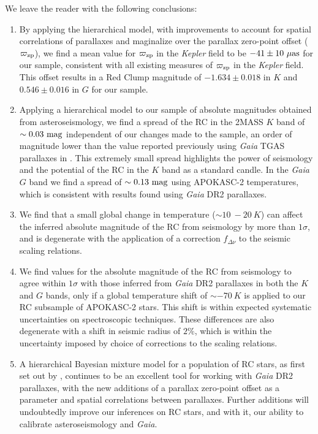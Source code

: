 \documentclass[fleqn,usenatbib]{mnras}
\newcommand{\oozp}{\mbox{$\varpi_{\rm zp}$}\xspace}
\newcommand{\fdnu}{\mbox{$f_{\Delta\nu}$}\xspace}
\newcommand{\kepler}{\emph{Kepler}\xspace}
\newcommand{\gaia}{\emph{Gaia}\xspace}
\newcommand{\nnew}[1]{#1}
\newcommand{\up}[1]{#1}
\begin{document}
We leave the reader with the following conclusions:

\begin{enumerate}
\item By applying the  hierarchical model, with improvements to account for spatial correlations of parallaxes and maginalize over the parallax zero-point offset (\oozp), \up{we find a mean value for \oozp in the \kepler field to be $-41 \pm 10\ \mu \rm as$ for our sample}, consistent with all existing measures of \oozp in the \kepler field. This offset results in a Red Clump magnitude of $-1.634 \pm 0.018$ in $K$ and $0.546 \pm 0.016$ in $G$ for our sample.

\item Applying a hierarchical model to our sample of absolute magnitudes obtained from asteroseismology, we find a spread of the RC in the 2MASS $K$ band of $\sim 0.03\ \rm mag$ independent of our changes made to the sample, an order of magnitude lower than the value reported previously using \gaia TGAS parallaxes in . This extremely small spread highlights the power of seismology and the potential of the RC in the $K$ band as a standard candle. In the \gaia $G$ band we find a spread of $\sim 0.13\ \rm mag$ using APOKASC-2 temperatures, which is consistent with results found using \gaia DR2 parallaxes.

\item We find that a small global change in temperature ($\sim 10\ - 20\ K$) can affect the inferred absolute magnitude of the RC from seismology by more than $1\sigma$, and is degenerate with the application of a correction \fdnu to the seismic scaling relations.

\nnew{\item We find values for the absolute magnitude of the RC from seismology to agree within $1\sigma$ with those inferred from \gaia DR2 parallaxes in both the $K$ and $G$ bands, only if a global temperature shift of $\sim -70\ K$ is applied to our RC subsample of APOKASC-2 stars. This shift is within expected systematic uncertainties on spectroscopic techniques. These differences are also degenerate with a shift in seismic radius of $2\%$, which is within the uncertainty imposed by choice of corrections to the scaling relations.}

\item A hierarchical Bayesian mixture model for a population of RC stars, as first set out by , continues to be an excellent tool for working with \gaia DR2 parallaxes, with the new additions of a parallax zero-point offset as a parameter and spatial correlations between parallaxes. Further additions will undoubtedly improve our inferences on RC stars, and with it, our ability to calibrate asteroseismology and \gaia.
\end{enumerate}
\end{document}
